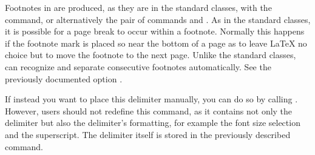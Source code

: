 \begin{Declaration}
\end{Declaration}%
Footnotes in \KOMAScript{} are produced, as they are in the standard classes,
with the  command, or alternatively the pair of commands
 and . As in the standard classes,
it is possible for a page break to occur within a footnote. Normally this
happens if the footnote mark is placed so near the bottom of a page as to
leave \LaTeX{} no choice but to move the footnote to the next page.
Unlike
the standard classes, \KOMAScript{} can recognize and separate consecutive
footnotes automatically.
See the previously
documented option .

If instead you want to place this delimiter manually, you can do so by calling
. However, users should not redefine this
command, as it contains not only the delimiter but also the delimiter's
formatting, for example the font size selection and the superscript. The
delimiter itself is stored in the previously described
%
%
 command.

